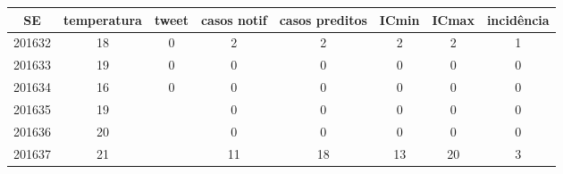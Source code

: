 \begin{tabular}{c|ccccccc}
  \hline
SE & temperatura & tweet & casos notif & casos preditos & ICmin & ICmax & incidência \\ 
  \hline
201632 & 18 & 0 & 2 & 2 & 2 & 2 & 1 \\ 
  201633 & 19 & 0 & 0 & 0 & 0 & 0 & 0 \\ 
  201634 & 16 & 0 & 0 & 0 & 0 & 0 & 0 \\ 
  201635 & 19 &  & 0 & 0 & 0 & 0 & 0 \\ 
  201636 & 20 &  & 0 & 0 & 0 & 0 & 0 \\ 
  201637 & 21 &  & 11 & 18 & 13 & 20 & 3 \\ 
   \hline
\end{tabular}
